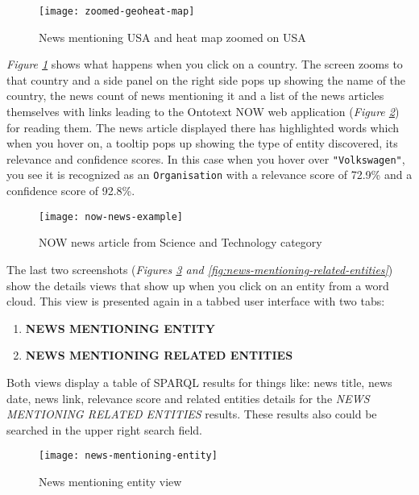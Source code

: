 \begin{figure}[h!]
    \centering
    \texttt{[image: zoomed-geoheat-map]}
    \caption{News mentioning USA and heat map zoomed on USA}
    \label{fig:zoomed-geoheat-map}
\end{figure}

\textit{Figure \ref{fig:zoomed-geoheat-map}} shows what happens when you click on a country. The screen zooms to that country and a side panel on the right side pops up showing the name of the country, the news count of news mentioning it and a list of the news articles themselves with links leading to the Ontotext NOW web application (\textit{Figure \ref{fig:now-news-example}}) for reading them. The news article displayed there has highlighted words which when you hover on, a tooltip pops up showing the type of entity discovered, its relevance and confidence scores. In this case when you hover over \texttt{"Volkswagen"}, you see it is recognized as an \texttt{Organisation} with a relevance score of 72.9\% and a confidence score of 92.8\%.

\newpage

\begin{figure}[h!]
    \centering
    \texttt{[image: now-news-example]}
    \caption{NOW news article from Science and Technology category}
    \label{fig:now-news-example}
\end{figure}

The last two screenshots (\textit{Figures \ref{fig:news-mentioning-entity} and \ref{fig:news-mentioning-related-entities}}) show the details views that show up when you click on an entity from a word cloud. This view is presented again in a tabbed user interface with two tabs:
\begin{enumerate}
    \item \textbf{NEWS MENTIONING ENTITY}
    \item \textbf{NEWS MENTIONING RELATED ENTITIES}
\end{enumerate}
Both views display a table of SPARQL results for things like: news title, news date, news link, relevance score and related entities details for the \textit{NEWS MENTIONING RELATED ENTITIES} results. These results also could be searched in the upper right search field.

\newpage

\begin{figure}[h!]
    \centering
    \texttt{[image: news-mentioning-entity]}
    \caption{News mentioning entity view}
    \label{fig:news-mentioning-entity}
\end{figure}

